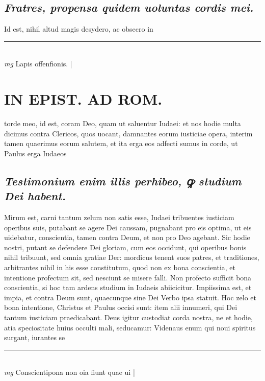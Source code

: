 \documentclass{article}
\begin{document}
\begin{pages}
\subsection*{\textit{Fratres, propensa quidem uoluntas cordis mei. }}\pstart Id est, nihil altud magis desydero, ac obsecro in  \pend\pstart \huge\textbf{}\normalsize  \pend
\vspace{0.5cm}\noindent
\vspace{0.2cm}\rule{1cm}{0.2pt}\\ 
\hspace{0.2cm}\textit{mg}
\footnotesize Lapis offenfionis. 
\normalsize| 
\section*{IN EPIST. AD ROM.  }
\marginpar{[ p.117 ]}\pstart torde meo, id est, coram Deo, quam ut saluentur Iudaei: et nos hodie multa dicimus contra Clericos, quos uocant, damnantes eorum iusticiae opera, interim tamen quaerimus eorum salutem, et ita erga eos adfecti sumus in corde, ut Paulus erga Iudaeos\pend
{}
{}
\subsection*{\textit{Testimonium enim illis perhibeo, ꝙ studium Dei habent. }}\pstart Mirum est, carni tantum zelum non satis esse, Iudaei tribuentes iusticiam operibus suis, putabant se agere Dei caussam, pugnabant pro eis optima, ut eis uidebatur, conscientia, tamen contra Deum, et non pro Deo agebant. Sic hodie nostri, putant se defendere Dei gloriam, cum eos occidunt, qui operibus bonis nihil tribuunt, sed omnia gratiae Der: mordicus tenent suos patres, et traditiones, arbitrantes nihil in his esse constitutum, quod non ex bona conscientia, et intentione profectum sit, sed nesciunt se misere falli. Non profecto sufficit bona conscientia, si hoc tam ardens studium in Iudaeis abiicicitur. Impiissima est, et impia, et contra Deum sunt, quaecunque sine Dei Verbo ipsa statuit. Hoc zelo et bona intentione, Christus et Paulus occisi sunt: item alii innumeri, qui Dei tantum iusticiam praedicabant. Deus igitur custodiat corda nostra, ne et hodie, atia speciositate huius occulti mali, seducamur: Videnaus enum qui noui spiritus surgant, iurantes se\pend
\vspace{0.5cm}\noindent
\vspace{0.2cm}\rule{1cm}{0.2pt}\\ 
\hspace{0.2cm}\textit{mg}
\footnotesize Conscientipona non oia fiunt quae ui
\normalsize| 

\end{pages}
\end{document}
